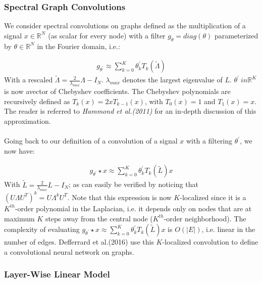 \documentclass[12pt,a4paper]{article}
\begin{document}
\subsubsection*{Spectral Graph Convolutions}
We consider spectral convolutions on graphs defined as the multiplication of a signal $x \in \mathbb{R}^{N}$ (as scalar for every node) with a filter $g_{\theta}=diag(\theta)$ parameterized by $\theta \in \mathbb{R}^{N}$  in the Fourier domain, i.e.:

\begin{align*}
g_{\theta^{'}} \approx \sum_{k=0}^{K}  \theta_{k}^{'} T_{k} ( \tilde{ \Lambda } )
\end{align*}
With a rescaled $\tilde{\Lambda} = \frac{2}{\lambda_{max}}\Lambda-I_{N}$. $\lambda_{max}$ denotes the largest eigenvalue of $L$. $\theta^{'} \ in \mathbb{R}^{K}$ is now avector of Chebyshev coefficients. The Chebyshev polynomials are recursively defined as $T_{k}(x)= 2xT_{k-1}(x)$, with $T_{0}(x)= 1$ and $T_{1}(x)=x$.  The reader is referred to \textit{Hammond et al.(2011)} for an in-depth discussion of this approximation.
\\ \\
Going back to our definition of a convolution of a signal $x$ with a filtering $\theta^{'}$, we now have:

\begin{align*}
g_{\theta^{'}} \star x \approx \sum_{k=0}^{K} \theta_{k}^{'} T_{k} ( \tilde{ L } )x
\end{align*}
With $\tilde{L} = \frac{2}{\lambda_{max}}L-I_{N}$; as can easily be verified by noticing that $(U\Lambda U^{T})^{k} = U\Lambda^{k} U^{T} $.  Note that this expression is now $K$-localized since it is a $K^{th}$-order polynomial in the Laplacian, i.e. it depends only on nodes that are at maximum $K$ steps away from the central node ($K^{th}$-order neighborhood). The complexity of evaluating $g_{\theta^{'}} \star x \approx \sum_{k=0}^{K} \theta_{k}^{'} T_{k} ( \tilde{ L } )x$ is $O(|E|)$, i.e. linear in the number of edges.  Defferrard et al.(2016) use this $K$-localized convolution to define a convolutional neural network on graphs.


\subsubsection*{Layer-Wise Linear Model}
\end{document}
